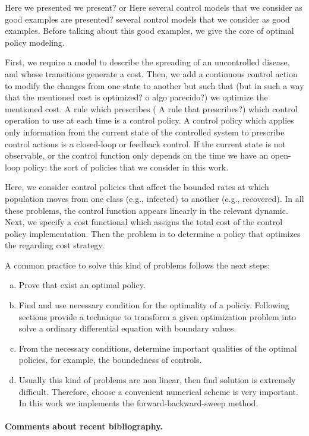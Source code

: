 Here we presented {\color{red} we present? or Here several control models that we consider as good 
examples are presented?} several control models that we consider as good 
examples. Before talking about this good examples, we give the core of optimal 
policy modeling.

First, we require a model to describe the spreading of an uncontrolled disease,
and whose transitions generate a cost. Then, we add a continuous control action
to modify the changes from one state to another but such that {\color{red}(but in such a way that the mentioned cost is optimized? o algo parecido?)} we optimize the
mentioned cost. A rule which prescribes {\color{red} ( A rule that prescribes?)} which control operation to use at each
time is a control policy. A control policy which applies only information from
the current state of the controlled system to prescribe control actions is a
closed-loop or feedback control. If the current state is not observable, or the
control function only depends on the time we have an open-loop policy: the sort
of policies that we consider in this work.

  Here, we consider control policies that affect the bounded rates at which
population moves from one class (e.g., infected) to another (e.g., recovered).
In all these problems, the control function appears linearly in the relevant
dynamic. Next, we specify a cost functional which assigns the total cost of the
control policy implementation. Then the problem is to determine a policy that
optimizes the regarding cost strategy.

  A common practice to solve this kind of problems follows the next steps:
  \begin{enumerate}[(a)]
    \item
      Prove that exist an optimal policy.
    \item 
      Find and use necessary condition for the optimality of a policiy.
      Following sections provide a technique to transform a given optimization
      problem into solve a ordinary differential equation with boundary values.
    \item 
      From the necessary conditions, determine important qualities of the 
      optimal policies, for example, the boundedness of controls.
    \item 
      Usually this kind of problems are non linear, then find solution is 
      extremely difficult. Therefore, choose a convenient numerical scheme is
      very important. In this work we implements the forward-backward-sweep 
      method.
  \end{enumerate}
\paragraph{Comments about recent bibliography.}
